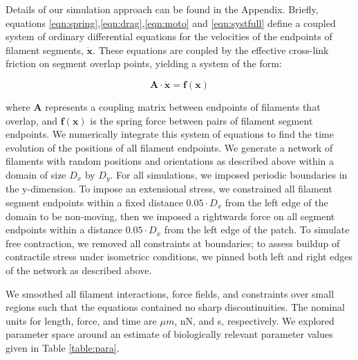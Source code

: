 Details of our simulation approach can be found in the Appendix. Briefly, equations \ref{eqn:spring},\ref{eqn:drag},\ref{eqn:moto} and \ref{eqn:systfull} define a coupled system of ordinary differential equations for the velocities of the endpoints of filament segments, $\mathbf{\dot{x}}$.  These equations are coupled by the effective cross-link friction on segment overlap points, yielding a system of the form:

\begin{equation}
\mathbf{A \cdot \dot x} = \mathbf{f(x)}
\end{equation}

where $\mathbf{A }$ represents a coupling matrix between endpoints of filaments that overlap, and $\mathbf{f(x)}$ is the spring force between pairs of filament segment endpoints.   We numerically integrate this system of equations to find the time evolution of the positions of all filament endpoints. We generate a network of filaments with random positions and orientations as described above within a domain of size $D_x$ by $D_y$.  For all simulations, we imposed periodic boundaries in the y-dimension. To impose an extensional stress, we constrained all filament segment endpoints within a fixed distance $0.05\cdot D_x$ from the left edge of the domain to be non-moving, then we imposed a rightwards force on all segment endpoints within a distance $0.05\cdot D_x$ from the left edge of the patch.   To simulate free contraction, we removed all constraints at boundaries; to assess buildup of contractile stress under isometricc conditions, we pinned both left and right edges of the network as described above.




We smoothed all filament interactions, force fields, and constraints over small regions such that the equations contained no sharp discontinuities. The nominal units for length, force, and time are $\mu m$, nN, and s, respectively.  We explored parameter space around an estimate of biologically relevant parameter values given in Table \ref{table:para}. 

